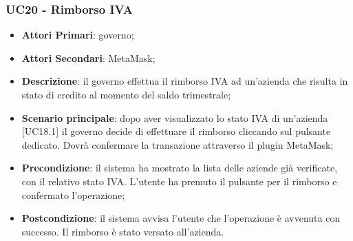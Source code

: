 \subsubsection{UC20 - Rimborso IVA}
\begin{itemize}
	\item \textbf{Attori Primari}:
	governo;
	\item \textbf{Attori Secondari}:
	MetaMask\glo;
	\item \textbf{Descrizione}: il governo effettua il rimborso IVA ad un'azienda che risulta in stato di credito al momento del saldo trimestrale;
	\item \textbf{Scenario principale}: dopo aver visualizzato lo stato IVA di un'azienda [UC18.1] il governo decide di effettuare il rimborso cliccando sul pulsante dedicato. Dovrà confermare la transazione attraverso il plugin MetaMask\glo;
	\item \textbf{Precondizione}: il sistema ha mostrato la lista delle aziende già verificate, con il relativo stato IVA. L'utente ha premuto il pulsante per il rimborso e confermato l'operazione;
	\item \textbf{Postcondizione}: il sistema avvisa l'utente che l'operazione è avvenuta con successo. Il rimborso è stato versato all'azienda.
\end{itemize} 

